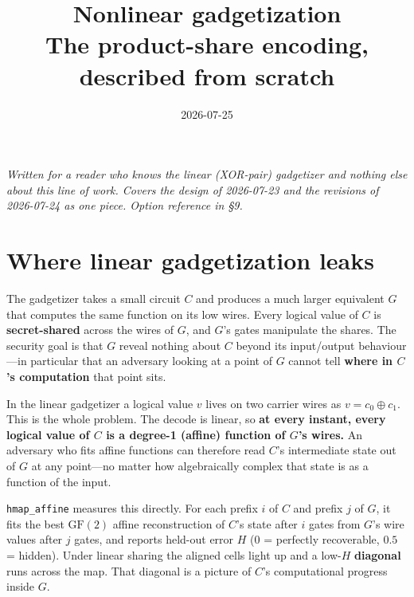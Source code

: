 \documentclass[11pt]{article}
\title{\textbf{Nonlinear gadgetization}\\[2pt]
\large The product-share encoding, described from scratch}
\author{}
\date{2026-07-25}
\newcommand{\xor}{\oplus}
\begin{document}
\maketitle

\noindent\emph{Written for a reader who knows the linear (XOR-pair) gadgetizer
and nothing else about this line of work. Covers the design of 2026-07-23 and
the revisions of 2026-07-24 as one piece. Option reference in \S9.}

\begin{center}
\end{center}

\section{Where linear gadgetization leaks}

The gadgetizer takes a small circuit $C$ and produces a much larger equivalent
$G$ that computes the same function on its low wires. Every logical value of $C$
is \textbf{secret-shared} across the wires of $G$, and $G$'s gates manipulate the
shares. The security goal is that $G$ reveal nothing about $C$ beyond its
input/output behaviour---in particular that an adversary looking at a point of
$G$ cannot tell \textbf{where in $C$'s computation} that point sits.

In the linear gadgetizer a logical value $v$ lives on two carrier wires as
$v=c_0\xor c_1$. This is the whole problem. The decode is linear, so
\textbf{at every instant, every logical value of $C$ is a degree-1 (affine)
function of $G$'s wires.} An adversary who fits affine functions can therefore
read $C$'s intermediate state out of $G$ at any point---no matter how
algebraically complex that state is as a function of the input.

\texttt{hmap\_affine} measures this directly. For each prefix $i$ of $C$ and
prefix $j$ of $G$, it fits the best $\mathrm{GF}(2)$ affine reconstruction of
$C$'s state after $i$ gates from $G$'s wire values after $j$ gates, and reports
held-out error $H$ ($0$ = perfectly recoverable, $0.5$ = hidden). Under linear
sharing the aligned cells light up and a low-$H$ \textbf{diagonal} runs across
the map. That diagonal is a picture of $C$'s computational progress inside $G$.
\end{document}
